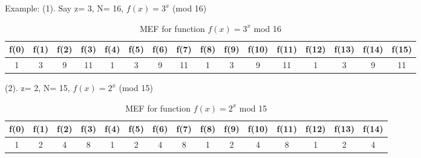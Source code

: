 Example: (1). Say z= 3, N= 16, $f(x) = 3^x$ (mod 16) \label{lab: Case I}


\begin{table}[h]
\begin{center}
\begin{tabular}{|c|c|c|c|c|c|c|c|c|c|c|c|c|c|c|c|}
\hline
f(0) & f(1) & f(2) & f(3) & f(4) & f(5) & f(6) & f(7) & f(8) & f(9) & f(10) & f(11) & f(12) & f(13) & f(14) & f(15) \\ \hline
1    & 3    & 9    & 11   & 1    & 3    & 9    & 11   & 1    & 3    & 9     & 11    & 1     & 3     & 9     & 11    \\ \hline
\end{tabular}
 \caption{MEF for function $f(x) = 3^x$ mod 16}
 \label{tab: caseI}
 \end{center}
\end{table}

(2). z= 2, N= 15, $f(x) = 2^x$ (mod 15) \label{lab: Case II}
 \begin{table}
\begin{center}
\begin{tabular}{|c|c|c|c|c|c|c|c|c|c|c|c|c|c|c|}
\hline
f(0) & f(1) & f(2) & f(3) & f(4) & f(5) & f(6) & f(7) & f(8) & f(9) & f(10) & f(11) & f(12) & f(13) & f(14) \\ \hline
1    & 2    & 4    & 8    & 1    & 2    & 4    & 8    & 1    & 2    & 4     & 8     & 1     & 2     & 4     \\ \hline
\end{tabular}
  \caption{MEF for function $f(x) = 2^x$ mod 15}
 \label{tab: caseII}
\end{center}
\end{table}

